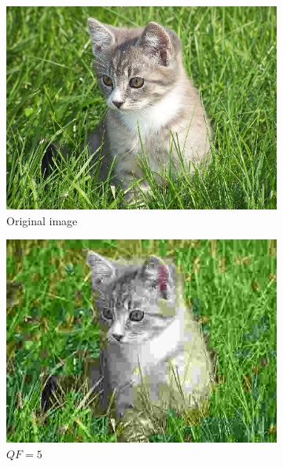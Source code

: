 \begin{figure}[ht]
\centering
\begin{subfigure}{.33\textwidth}
  \centering
  \includegraphics[width=.98\linewidth]{../images/compression_examples/original}
  \caption{Original image}
\end{subfigure}%
\begin{subfigure}{.33\textwidth}
  \centering
  \includegraphics[width=.98\linewidth]{../images/compression_examples/qf5}
  \caption{$QF=5$}
\end{subfigure}%
\begin{subfigure}{.33\textwidth}
  \centering

\end{subfigure}
\end{figure}
